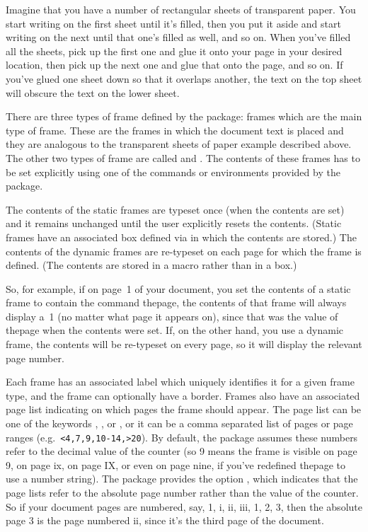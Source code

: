 Imagine that you have a number of rectangular sheets of transparent
paper. You start writing on the first sheet until it's filled, then
you put it aside and start writing on the next until that one's
filled as well, and so on. When you've filled all the sheets, pick
up the first one and glue it onto your page in your desired
location, then pick up the next one and glue that onto the page, and
so on. If you've glued one sheet down so that it overlaps another,
the text on the top sheet will obscure the text on the lower sheet.

There are three types of frame defined by the 
package:  frames
which are the main type of frame. These are the frames in which the
document text is placed and they are analogous to the transparent
sheets of paper example described above. The other two types of frame are
called  and .  The contents of these frames has
to be set explicitly using one of the commands or environments
provided by the  package.

The contents of the static frames are typeset once (when the
contents are set) and it remains unchanged until the user explicitly
resets the contents. (Static frames have an associated box defined
via  in which the contents are stored.) The contents
of the dynamic frames are re-typeset on each page for which the
frame is defined. (The contents are stored in a macro rather than in
a box.)

So, for example, if on page~1 of your document, you set the contents
of a static frame to contain the command \gls{thepage}, the
contents of that frame will always display a~1 (no matter what page
it appears on), since that was the value of \gls{thepage} when
the contents were set. If, on the other hand, you use a dynamic
frame, the contents will be re-typeset on every page, so it will
display the relevant page number.

Each frame has an associated label which uniquely identifies it for
a given frame type, and the frame can optionally have a border. Frames also
have an associated page list indicating on which pages the frame
should appear.  The page list can be one of the keywords
, ,  or , or it
can be a comma separated list of pages or page ranges (e.g.\
\verb|<4,7,9,10-14,>20|). By default, the  package
assumes these numbers refer to the decimal value of the
 counter (so 9 means the frame is visible on page 9, on
page ix, on page IX, or even on page nine, if you've redefined
\gls{thepage} to use a number string). The 
package provides the option , which indicates
that the page lists refer to the absolute page number rather than
the value of the \ctr{page} counter. So if your document pages
are numbered, say, 1, i, ii, iii, 1, 2, 3, then the absolute page 3
is the page numbered ii, since it's the third page of the document.

